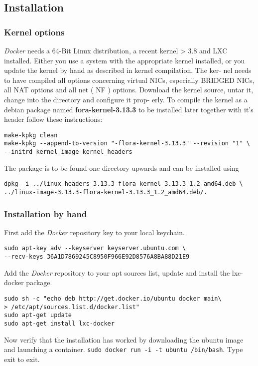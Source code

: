 \documentclass[11pt]{article}
\begin{document}
\subsection{Installation}
\label{sec-2-2}
\subsubsection{Kernel options}
\label{sec-2-2-1}

\emph{Docker} needs a 64-Bit Linux distribution, a recent kernel > 3.8 and LXC
installed. Either you use a system with the appropriate kernel installed, or
you update the kernel by hand as described in kernel compilation. The ker-
nel needs to have compiled all options concerning virtual NICs, especially
BRIDGED NICs, all NAT options and all net  ( NF ) options. Download
the kernel source, untar it, change into the directory and configure it prop-
erly. To compile the kernel as a debian package named \textbf{fora-kernel-3.13.3}
to be installed later together with it's header follow these instructions:

\begin{verbatim}
make-kpkg clean
make-kpkg --append-to-version "-flora-kernel-3.13.3" --revision "1" \
--initrd kernel_image kernel_headers
\end{verbatim}
The package is to be found one directory upwards and can be installed using

\begin{verbatim}
dpkg -i ../linux-headers-3.13.3-flora-kernel-3.13.3_1.2_amd64.deb \
../linux-image-3.13.3-flora-kernel-3.13.3_1.2_amd64.deb/.
\end{verbatim}
\subsubsection{Installation by hand}
\label{sec-2-2-2}

First add the \emph{Docker} repository key to your local keychain.

\begin{verbatim}
sudo apt-key adv --keyserver keyserver.ubuntu.com \
--recv-keys 36A1D7869245C8950F966E92D8576A8BA88D21E9
\end{verbatim}
Add the \emph{Docker} repository to your apt sources list, update and install
the lxc-docker package.

\begin{verbatim}
sudo sh -c "echo deb http://get.docker.io/ubuntu docker main\
> /etc/apt/sources.list.d/docker.list"
sudo apt-get update
sudo apt-get install lxc-docker
\end{verbatim}
Now verify that the installation has worked by downloading the ubuntu
image and launching a container. \texttt{sudo docker run -i -t ubuntu /bin/bash}.
Type exit to exit.
\end{document}
